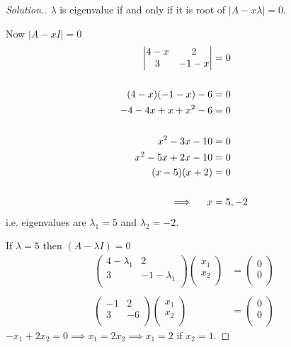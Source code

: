 \documentclass[11pt,a4paper]{article}
\theoremstyle{definition}
\newenvironment{solution}
  {\renewcommand{\qedsymbol}{}\begin{proof}[\textit{Solution}.]}
  {\end{proof}}
\begin{document}
\begin{solution}
$\lambda$ is eigenvalue if and only if it is root of $|A-x\lambda|=0$.

Now $|A-xI|=0$
\begin{align*}
\begin{vmatrix}
4-x&2\\3&-1-x\\
\end{vmatrix}
&=0\\\\
(4-x)(-1-x)-6 &=0\\
-4-4x+x+x^2-6 &=0\\\\
x^2-3x-10 &=0\\
x^2-5x+2x-10 &=0\\
(x-5)(x+2) &=0\\\\
\implies \hspace{0.4cm} x&=5, -2
\end{align*}
i.e. eigenvalues are $\lambda_1=5$ and $\lambda_2=-2$.

If $\lambda=5$ then $(A-\lambda I)=0$
\begin{align*}
\begin{pmatrix}
4-\lambda_1 &2\\3&-1-\lambda_1\\
\end{pmatrix}
\begin{pmatrix}
x_1\\x_2\\
\end{pmatrix}
&=
\begin{pmatrix}
0\\0\\
\end{pmatrix}\\\\
\begin{pmatrix}
-1&2\\3&-6\\
\end{pmatrix}
\begin{pmatrix}
x_1\\x_2\\
\end{pmatrix}
&=
\begin{pmatrix}
0\\0\\
\end{pmatrix}
\end{align*}
$-x_1+2x_2=0\implies x_1=2x_2\implies x_1=2$ if $x_2=1$.


\end{solution}
\end{document}
